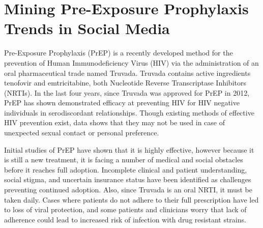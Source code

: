 


%



\section{Mining Pre-Exposure Prophylaxis Trends in Social Media}

Pre-Exposure Prophylaxis (PrEP) is a recently developed method for the prevention of Human Immunodeficiency Virus (HIV) via the administration of an oral pharmaceutical trade named Truvada. Truvada contains active ingredients tenofovir and emtricitabine, both Nucleotide Reverse Transcriptase Inhibitors (NRTIs). In the last four years, since Truvada was approved for PrEP in 2012, PrEP has shown demonstrated efficacy at preventing HIV for HIV negative individuals in serodiscordant relationships\cite{liu2014early}. Though existing methods of effective HIV prevention exist, data shows that they may not be used in case of unexpected sexual contact or personal preference\cite{taylor2016life}. 

Initial studies of PrEP have shown that it is highly effective\cite{golub2013efficacy}, however because it is still a new treatment, it is facing a number of medical and social obstacles before it reaches full adoption. Incomplete clinical and patient understanding, social stigma, and uncertain insurance status have been identified as challenges preventing continued adoption\cite{calabrese2015stigma}. Also, since Truvada is an oral NRTI, it must be taken daily. Cases where patients do not adhere to their full prescription have led to loss of viral protection, and some patients and clinicians worry that lack of adherence could lead to increased risk of infection with drug resistant strains\cite{arnold2012qualitative}.

